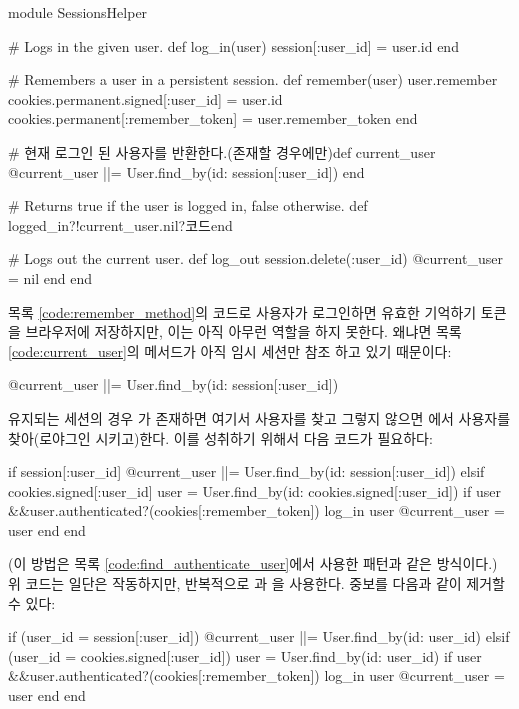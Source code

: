 {{\begin{codelisting}
\begin{code} module SessionsHelper 

# Logs in the given user. def log_in(user) session[:user_id] = user.id end 

# Remembers a user in a persistent session. def remember(user) user.remember cookies.permanent.signed[:user_id] = user.id cookies.permanent[:remember_token] = user.remember_token end 

# 현재 로그인 된 사용자를 반환한다.(존재할 경우에만)def current_user @current_user ||= User.find_by(id: session[:user_id]) end 

# Returns true if the user is logged in, false otherwise. def logged_in?!current_user.nil?코드end 

# Logs out the current user. def log_out session.delete(:user_id) @current_user = nil end end \end{code} \end{codelisting} 

목록 \ref{code:remember_method}의 코드로 사용자가 로그인하면 유효한 기억하기 토큰을 브라우저에 저장하지만, 이는 아직 아무런 역할을 하지 못한다. 왜냐면 목록 \ref{code:current_user}의  메서드가 아직 임시 세션만 참조 하고 있기 때문이다: 

\begin{code} @current_user ||= User.find_by(id: session[:user_id]) \end{code} 

\noindent 유지되는 세션의 경우 가 존재하면 여기서 사용자를 찾고 그렇지 않으면 에서 사용자를 찾아(로야그인 시키고)한다. 이를 성취하기 위해서 다음 코드가 필요하다: 

\begin{code} if session[:user_id] @current_user ||= User.find_by(id: session[:user_id]) elsif cookies.signed[:user_id] user = User.find_by(id: cookies.signed[:user_id]) if user &&user.authenticated?(cookies[:remember_token]) log_in user @current_user = user end end \end{code} 

\noindent (이 방법은 목록 \ref{code:find_authenticate_user}에서 사용한  패턴과 같은 방식이다.) 위 코드는 일단은 작동하지만, 반복적으로  과 을 사용한다. 중보를 다음과 같이 제거할 수 있다: 

\begin{code} if (user_id = session[:user_id]) @current_user ||= User.find_by(id: user_id) elsif (user_id = cookies.signed[:user_id]) user = User.find_by(id: user_id) if user &&user.authenticated?(cookies[:remember_token]) log_in user @current_user = user end end \end{code} 

}}
